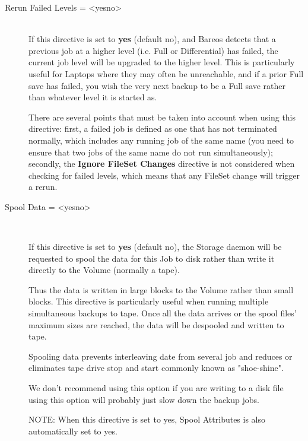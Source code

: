 \begin{description}
\item [Rerun Failed Levels = {\textless}yes{\textbar}no{\textgreater}] \hfill \\
If this directive is set to {\bf yes} (default no), and Bareos detects that
a previous job at a higher level (i.e.  Full or Differential) has failed,
the current job level will be upgraded to the higher level.  This is
particularly useful for Laptops where they may often be unreachable, and if
a prior Full save has failed, you wish the very next backup to be a Full
save rather than whatever level it is started as.

There are several points that must be taken into account when using this
directive: first, a failed job is defined as one that has not terminated
normally, which includes any running job of the same name (you need to
ensure that two jobs of the same name do not run simultaneously);
secondly, the {\bf Ignore FileSet Changes} directive is not considered
when checking for failed levels, which means that any FileSet change will
trigger a rerun.

\item [Spool Data = {\textless}yes{\textbar}no{\textgreater}] \hfill \\

If this directive is set  to {\bf yes} (default no), the Storage daemon will
be requested  to spool the data for this Job to disk rather than write it
directly to the Volume (normally a tape).

Thus the data is written in large blocks to the Volume rather than small
blocks.  This directive is particularly useful when running multiple
simultaneous backups to tape.  Once all the data arrives or the spool
files' maximum sizes are reached, the data will be despooled and written
to tape.

Spooling data prevents interleaving date from several job and reduces or
eliminates tape drive stop and start commonly known as "shoe-shine".

We don't recommend using this option if you are writing to a disk file
using this option will probably just slow down the backup jobs.

NOTE: When this directive is set to yes, Spool Attributes is also
automatically set to yes.


\end{description}
